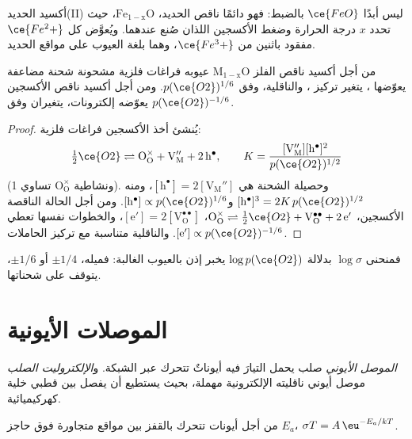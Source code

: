 أكسيد الحديد(II) ليس أبدًا $\ce{FeO}$ بالضبط: فهو دائمًا ناقص الحديد،
$\mathrm{Fe_{1-x}O}$، حيث تحدد $x$ درجة الحرارة وضغط الأكسجين اللذان صُنع عندهما. ويُعوَّض كل $\ce{Fe^2+}$ مفقود باثنين من
$\ce{Fe^3+}$، وهما بلغة العيوب  على مواقع الحديد.

\begin{proposition}\label{prop:b3:solid-state:brouwer}
من أجل أكسيد ناقص الفلز $\mathrm{M_{1-x}O}$ عيوبه فراغات فلزية مشحونة شحنة مضاعفة
يعوّضها ، يتغير تركيز ، والناقلية، وفق
$p(\ce{O2})^{1/6}$. ومن أجل أكسيد ناقص الأكسجين يعوّضه إلكترونات، يتغيران وفق
$p(\ce{O2})^{-1/6}$.
\end{proposition}

\begin{proof}
يُنشئ أخذ الأكسجين فراغات فلزية:
\[
  \tfrac12\ce{O2} \rightleftharpoons \mathrm{O_O^{\times} + V_M'' + 2\,h^{\bullet}}, \qquad K = \frac{[\mathrm{V_M''}][\mathrm h^\bullet]^2}{p(\ce{O2})^{1/2}}
\]
(ونشاطية $\mathrm{O_O^{\times}}$ تساوي 1). 
وحصيلة الشحنة هي $[\mathrm h^\bullet] = 2[\mathrm{V_M''}]$، ومنه $[\mathrm h^\bullet]^3 = 2K\,p(\ce{O2})^{1/2}$ و$[\mathrm h^\bullet] \propto p(\ce{O2})^{1/6}$. ومن أجل
الحالة الناقصة الأكسجين، $\mathrm{O_O^{\times}} \rightleftharpoons \tfrac12\ce{O2} + \mathrm{V_O^{\bullet\bullet} + 2\,e'}$، $[\mathrm e'] = 2[\mathrm{V_O^{\bullet\bullet}}]$، والخطوات نفسها تعطي $[\mathrm e'] \propto p(\ce{O2})^{-1/6}$.
والناقلية متناسبة مع تركيز الحاملات.
\end{proof}

فمنحنى $\log\sigma$ بدلالة $\log p(\ce{O2})$ يخبر إذن بالعيوب الغالبة: فميله،
$\pm 1/4$ أو $\pm 1/6$، يتوقف على شحناتها.

\section{الموصلات الأيونية}

\begin{definition}\label{def:b3:solid-state:ionic-conductor}
\emph{الموصل الأيوني} صلب يحمل التيارَ فيه
أيوناتٌ تتحرك عبر الشبكة. و\emph{الإلكتروليت
الصلب} موصل أيوني ناقليته الإلكترونية
مهملة، بحيث يستطيع أن يفصل بين قطبي
خلية كهركيميائية.
\end{definition}

\begin{proposition}\label{prop:b3:solid-state:ionic-arrhenius}
من أجل أيونات تتحرك بالقفز بين مواقع متجاورة فوق حاجز $E_a$،
$\sigma T = A\,\eu^{-E_a/kT}$.
\end{proposition}

